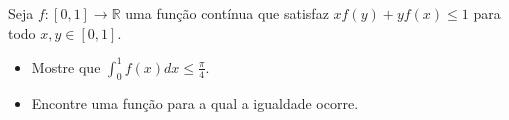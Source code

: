 Seja \(f\colon  [0,1]\to\mathbb{R}\) uma função contínua que satisfaz \(xf(y)+yf(x)\le 1\) para todo \(x,y\in[0,1]\).

\begin{itemize}
\item[(a)] Mostre que \(\int^1_0 f(x)dx \le \frac{\pi}4\).
\item[(b)] Encontre uma função para a qual a igualdade ocorre.
\end{itemize}
